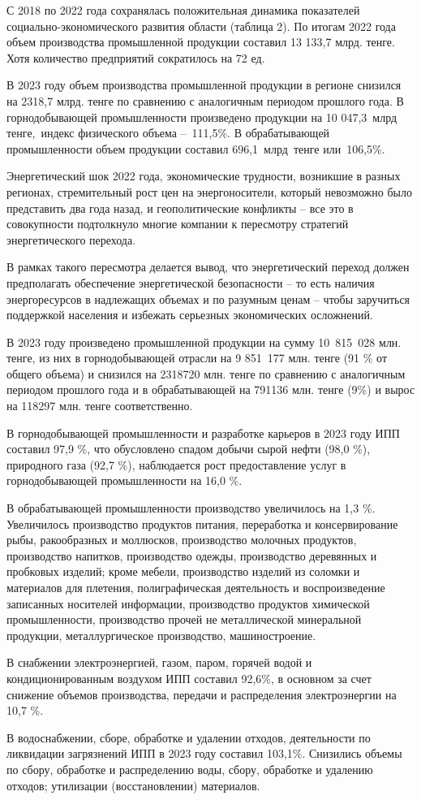 \begin{multicols}{2}
С 2018 по 2022 года сохранялась положительная динамика показателей
социально-экономического развития области (таблица 2). По итогам 2022
года объем производства промышленной продукции составил 13 133,7 млрд.
тенге. Хотя количество предприятий сократилось на 72 ед.

В 2023 году объем производства промышленной продукции в регионе
снизился на 2318,7 млрд. тенге по сравнению с аналогичным периодом
прошлого года. В горнодобывающей промышленности произведено продукции на
10 047,3~млрд тенге,~индекс физического объема --~111,5\%. В
обрабатывающей промышленности объем продукции составил 696,1~млрд~тенге
или~106,5\%.

Энергетический шок 2022 года, экономические трудности, возникшие в
разных регионах, стремительный рост цен на энергоносители, который
невозможно было представить два года назад, и геополитические конфликты
-- все это в совокупности подтолкнуло многие компании к пересмотру
стратегий энергетического перехода.

В рамках такого пересмотра делается вывод, что энергетический переход
должен предполагать обеспечение энергетической безопасности -- то есть
наличия энергоресурсов в надлежащих объемах и по разумным ценам -- чтобы
заручиться поддержкой населения и избежать серьезных экономических
осложнений.

В 2023 году произведено промышленной продукции на сумму 10~815~028 млн.
тенге, из них в горнодобывающей отрасли на 9 851~177 млн. тенге (91 \%
от общего объема) и снизился на 2318720 млн. тенге по сравнению с
аналогичным периодом прошлого года и в обрабатывающей на 791136 млн.
тенге (9\%) и вырос на 118297 млн. тенге соответственно.

В горнодобывающей промышленности и разработке карьеров в 2023 году ИПП
составил 97,9 \%, что обусловлено спадом добычи сырой нефти (98,0 \%),
природного газа (92,7 \%), наблюдается рост предоставление услуг в
горнодобывающей промышленности на 16,0 \%.

В обрабатывающей промышленности производство увеличилось на 1,3 \%.
Увеличилось производство продуктов питания, переработка и
консервирование рыбы, ракообразных и моллюсков, производство молочных
продуктов, производство напитков, производство одежды, производство
деревянных и пробковых изделий; кроме мебели, производство изделий из
соломки и материалов для плетения, полиграфическая деятельность и
воспроизведение записанных носителей информации, производство продуктов
химической промышленности, производство прочей не металлической
минеральной продукции, металлургическое производство, машиностроение.

В снабжении электроэнергией, газом, паром, горячей водой и
кондиционированным воздухом ИПП составил 92,6\%, в основном за счет
снижение объемов производства, передачи и распределения электроэнергии
на 10,7 \%.

В водоснабжении, сборе, обработке и удалении отходов, деятельности по
ликвидации загрязнений ИПП в 2023 году составил 103,1\%. Снизились
объемы по сбору, обработке и распределению воды, сбору, обработке и
удалению отходов; утилизации (восстановлении) материалов.
\end{multicols}

